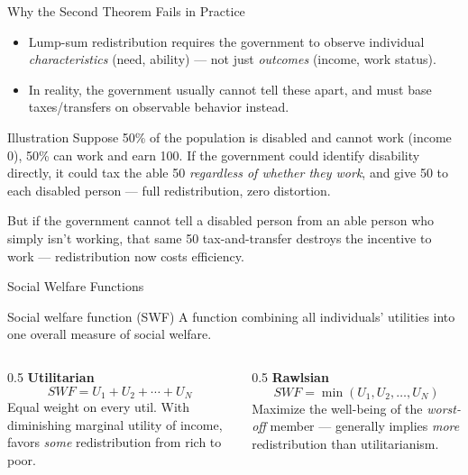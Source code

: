 \documentclass[11pt,aspectratio=169]{beamer}
\begin{document}
\begin{frame}{Why the Second Theorem Fails in Practice}
  \begin{itemize}
    \item Lump-sum redistribution requires the government to observe individual \emph{characteristics} (need, ability) --- not just \emph{outcomes} (income, work status).
    \item In reality, the government usually cannot tell these apart, and must base taxes/transfers on observable behavior instead.
  \end{itemize}
  \begin{alertblock}{Illustration}
    Suppose 50\% of the population is disabled and cannot work (income \texteuro{}0), 50\% can work and earn \texteuro{}100. If the government could identify disability directly, it could tax the able \texteuro{}50 \emph{regardless of whether they work}, and give \texteuro{}50 to each disabled person --- full redistribution, zero distortion.
  \end{alertblock}
  \centering \small
  But if the government cannot tell a disabled person from an able person who simply isn't working, that same \texteuro{}50 tax-and-transfer destroys the incentive to work --- redistribution now costs efficiency.
\end{frame}

\begin{frame}{Social Welfare Functions}
  \begin{block}{Social welfare function (SWF)}
    A function combining all individuals' utilities into one overall measure of social welfare.
  \end{block}
  \begin{columns}[T]
    \begin{column}{0.5\textwidth}
      \textbf{Utilitarian}
      \[SWF = U_1 + U_2 + \cdots + U_N\]
      Equal weight on every util. With diminishing marginal utility of income, favors \emph{some} redistribution from rich to poor.
    \end{column}
    \begin{column}{0.5\textwidth}
      \textbf{Rawlsian}
      \[SWF = \min(U_1, U_2, \ldots, U_N)\]
      Maximize the well-being of the \emph{worst-off} member --- generally implies \emph{more} redistribution than utilitarianism.
    \end{column}
  \end{columns}
\end{frame}
\end{document}

